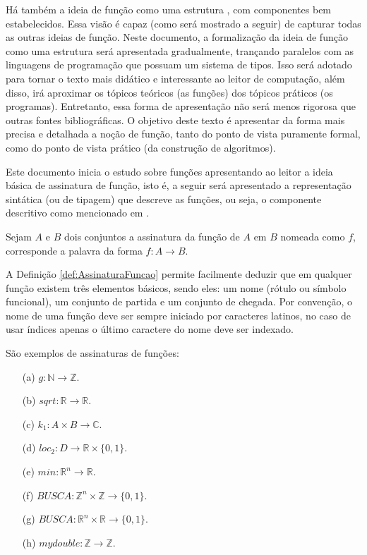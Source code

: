 Há também a ideia de função como uma estrutura \cite{judith2021}, com componentes bem estabelecidos. Essa visão é capaz (como será mostrado a seguir) de capturar todas as outras ideias de função.  Neste documento, a formalização da ideia de função como uma estrutura será apresentada gradualmente, trançando paralelos com as linguagens de programação que possuam um sistema de tipos. Isso será adotado para tornar o texto mais didático e interessante ao leitor de computação, além disso, irá aproximar os tópicos teóricos (as funções) dos tópicos práticos (os programas). Entretanto, essa forma de apresentação não será menos rigorosa que outras fontes bibliográficas. O objetivo deste texto é apresentar da forma mais precisa e detalhada a noção de função, tanto do ponto de vista puramente formal, como do ponto de vista prático (da construção de algoritmos).

Este documento inicia o estudo sobre funções apresentando ao leitor a ideia básica de assinatura de função, isto é, a seguir será apresentado a representação sintática (ou de tipagem) que descreve as funções, ou seja, o componente descritivo como mencionado em \cite{levin2021}.

\begin{definicao}\label{def:AssinaturaFuncao}
	Sejam $A$ e $B$ dois conjuntos a assinatura da função de $A$ em $B$ nomeada como $f$, corresponde a palavra da forma $f: A \rightarrow B$.
\end{definicao}

A Definição \ref{def:AssinaturaFuncao} permite facilmente deduzir que em qualquer função existem três elementos básicos, sendo eles: um nome (rótulo ou símbolo funcional), um conjunto de partida e um conjunto de chegada. Por convenção, o nome de uma função deve ser sempre iniciado por caracteres latinos, no caso de usar índices apenas o último caractere do nome deve ser indexado.

\begin{exemplo}\label{exe:AssinaturaFuncao}
	São exemplos de assinaturas de funções:
	\begin{itemize}
		\item[(a)] $g : \mathbb{N} \rightarrow \mathbb{Z}$.
		\item[(b)] $sqrt : \mathbb{R} \rightarrow \mathbb{R}$.
		\item[(c)] $k_1 : A \times B \rightarrow \mathbb{C}$.
		\item[(d)] $loc_2 : D \rightarrow \mathbb{R} \times \{0,1\}$.
		\item[(e)] $min : \mathbb{R}^n \rightarrow \mathbb{R}$.
		\item[(f)] $BUSCA : \mathbb{Z}^n \times \mathbb{Z} \rightarrow \{0,1\}$.
		\item[(g)] $BUSCA : \mathbb{R}^n \times \mathbb{R} \rightarrow \{0,1\}$.
    \item[(h)] $mydouble: \mathbb{Z} \rightarrow \mathbb{Z}$.
	\end{itemize}
\end{exemplo}

